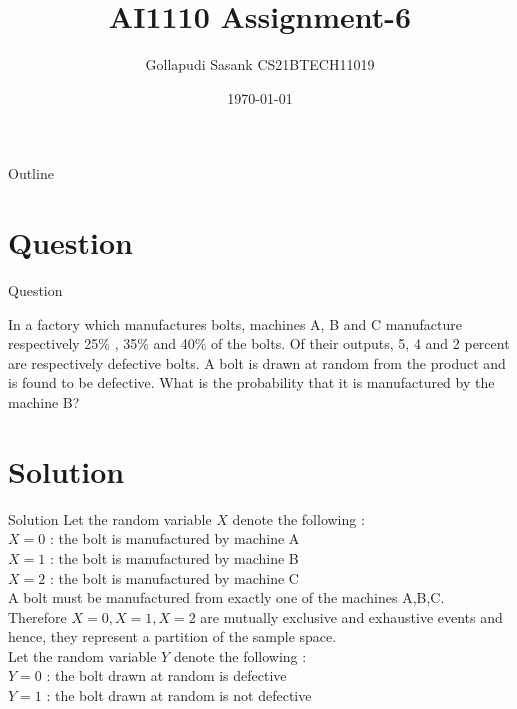 \documentclass{beamer}
\title{AI1110 Assignment-6}
\author{Gollapudi Sasank CS21BTECH11019}
\date{\today}
\begin{document}
\begin{frame}
    \titlepage 
\end{frame}

\logo{}


\begin{frame}{Outline}
    \tableofcontents
\end{frame}


\section{Question}
\begin{frame}{Question}

In a factory which manufactures bolts, machines A, B and
C manufacture respectively 25\% , 35\% and 40\% of the bolts.
Of their outputs, 5, 4 and 2 percent are respectively defective
bolts. A bolt is drawn at random from the product and is found
to be defective. What is the probability that it is manufactured
by the machine B?

\end{frame}


\section{Solution}
\begin{frame}{Solution}
Let  the random variable $X$ denote the following : \\
$X=0$ : the bolt is manufactured by machine A \\
$X=1$ : the bolt is manufactured by machine B \\
$X=2$ : the bolt is manufactured by machine C \\
A bolt must be manufactured from exactly one of the machines A,B,C.\\
Therefore $X=0,X=1,X=2$ are mutually exclusive and exhaustive events and hence, they represent a partition of the sample space.\\
Let the random variable $Y$ denote the following : \\
$Y=0$ : the bolt drawn at random is defective \\
$Y=1$ : the bolt drawn at random is not defective \\
\end{frame} 
\end{document}
